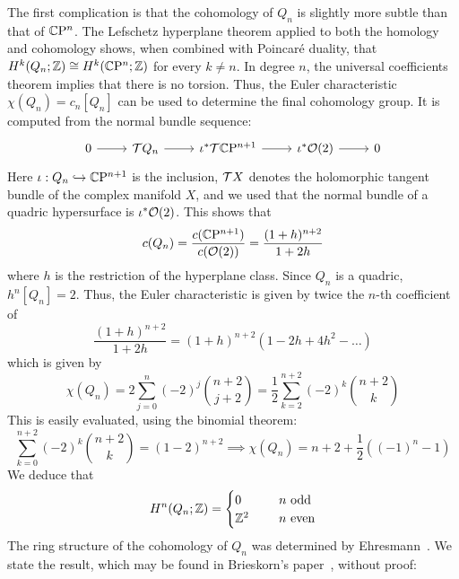 The first complication is that the cohomology of $Q_n$ is slightly more subtle than that of $\mathbb{C}\mathrm{P}^n$. The Lefschetz hyperplane theorem applied to both the homology and cohomology shows, when combined with Poincar\'e duality, that $H^k(Q_n;\mathbb{Z})\cong H^k(\mathbb{C}\mathrm{P}^n;\mathbb{Z})$ for every $k\neq n$. In degree $n$, the universal coefficients theorem implies that there is no torsion. Thus, the Euler characteristic $\chi(Q_n)=c_n[Q_n]$ can be used to determine the final cohomology group. It is computed from the normal bundle sequence:
\begin{equation*}
	\begin{tikzcd}
		 0 \ar[r] & \mc TQ_n \ar[r] & \iota^*\mc T\CP^{n+1} \ar[r] & \iota^*\mc O(2) \ar[r] & 0
	\end{tikzcd}
\end{equation*}
Here $\iota:Q_n\hookrightarrow \mathbb{C}\mathrm{P}^{n+1}$ is the inclusion, $\mathcal{T}X$ denotes the holomorphic tangent bundle of the complex manifold $X$, and we used that the normal bundle of a quadric hypersurface is $\iota^*\mathcal{O}(2)$. This shows that
\begin{equation*}
	c(Q_n)=\frac{c(\mathbb{C}\mathrm{P}^{n+1})}{c(\mathcal{O}(2))}=\frac{(1+h)^{n+2}}{1+2h}
\end{equation*}
where $h$ is the restriction of the hyperplane class. Since $Q_n$ is a quadric, $h^n[Q_n]=2$. Thus, the Euler characteristic is given by twice the $n$-th coefficient of
\begin{equation*}
	\frac{(1+h)^{n+2}}{1+2h}=(1+h)^{n+2}(1-2h+4h^2-\dots )
\end{equation*}
which is given by
\begin{equation*}
	\chi(Q_n)=2\sum_{j=0}^n (-2)^j \binom{n+2}{j+2}
	=\frac{1}{2}\sum_{k=2}^{n+2} (-2)^k \binom{n+2}{k}
\end{equation*}
This is easily evaluated, using the binomial theorem:
\begin{equation*}
	\sum_{k=0}^{n+2} (-2)^k\binom{n+2}{k}=(1-2)^{n+2}\implies 
	\chi(Q_n)=n+2+\frac{1}{2}((-1)^n-1)
\end{equation*}
We deduce that
\begin{equation*}
	H^n(Q_n;\mathbb{Z})=
	\begin{cases}
		0 \qquad & n\text{ odd}\\
		\mathbb{Z}^2 &n\text{ even}
	\end{cases}
\end{equation*}
The ring structure of the cohomology of $Q_n$ was determined by Ehresmann~\cite{Ehr1934}. We state the result, which may be found in Brieskorn's paper~\cite{Bri1964}, without proof:

